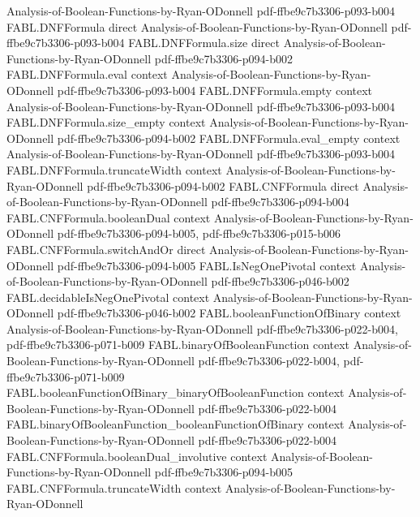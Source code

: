 \begin{theorem}
  {Analysis-of-Boolean-Functions-by-Ryan-ODonnell}
  {pdf-ffbe9c7b3306-p093-b004}
\proofstep
  {FABL.DNFFormula}
  {direct}
  {Analysis-of-Boolean-Functions-by-Ryan-ODonnell}
  {pdf-ffbe9c7b3306-p093-b004}
\proofstep
  {FABL.DNFFormula.size}
  {direct}
  {Analysis-of-Boolean-Functions-by-Ryan-ODonnell}
  {pdf-ffbe9c7b3306-p094-b002}
\proofstep
  {FABL.DNFFormula.eval}
  {context}
  {Analysis-of-Boolean-Functions-by-Ryan-ODonnell}
  {pdf-ffbe9c7b3306-p093-b004}
\proofstep
  {FABL.DNFFormula.empty}
  {context}
  {Analysis-of-Boolean-Functions-by-Ryan-ODonnell}
  {pdf-ffbe9c7b3306-p093-b004}
\proofstep
  {FABL.DNFFormula.size_empty}
  {context}
  {Analysis-of-Boolean-Functions-by-Ryan-ODonnell}
  {pdf-ffbe9c7b3306-p094-b002}
\proofstep
  {FABL.DNFFormula.eval_empty}
  {context}
  {Analysis-of-Boolean-Functions-by-Ryan-ODonnell}
  {pdf-ffbe9c7b3306-p093-b004}
\proofstep
  {FABL.DNFFormula.truncateWidth}
  {context}
  {Analysis-of-Boolean-Functions-by-Ryan-ODonnell}
  {pdf-ffbe9c7b3306-p094-b002}
\proofstep
  {FABL.CNFFormula}
  {direct}
  {Analysis-of-Boolean-Functions-by-Ryan-ODonnell}
  {pdf-ffbe9c7b3306-p094-b004}
\proofstep
  {FABL.CNFFormula.booleanDual}
  {context}
  {Analysis-of-Boolean-Functions-by-Ryan-ODonnell}
  {pdf-ffbe9c7b3306-p094-b005,
    pdf-ffbe9c7b3306-p015-b006}
\proofstep
  {FABL.CNFFormula.switchAndOr}
  {direct}
  {Analysis-of-Boolean-Functions-by-Ryan-ODonnell}
  {pdf-ffbe9c7b3306-p094-b005}
\proofstep
  {FABL.IsNegOnePivotal}
  {context}
  {Analysis-of-Boolean-Functions-by-Ryan-ODonnell}
  {pdf-ffbe9c7b3306-p046-b002}
\proofstep
  {FABL.decidableIsNegOnePivotal}
  {context}
  {Analysis-of-Boolean-Functions-by-Ryan-ODonnell}
  {pdf-ffbe9c7b3306-p046-b002}
\proofstep
  {FABL.booleanFunctionOfBinary}
  {context}
  {Analysis-of-Boolean-Functions-by-Ryan-ODonnell}
  {pdf-ffbe9c7b3306-p022-b004,
    pdf-ffbe9c7b3306-p071-b009}
\proofstep
  {FABL.binaryOfBooleanFunction}
  {context}
  {Analysis-of-Boolean-Functions-by-Ryan-ODonnell}
  {pdf-ffbe9c7b3306-p022-b004,
    pdf-ffbe9c7b3306-p071-b009}
\proofstep
  {FABL.booleanFunctionOfBinary_binaryOfBooleanFunction}
  {context}
  {Analysis-of-Boolean-Functions-by-Ryan-ODonnell}
  {pdf-ffbe9c7b3306-p022-b004}
\proofstep
  {FABL.binaryOfBooleanFunction_booleanFunctionOfBinary}
  {context}
  {Analysis-of-Boolean-Functions-by-Ryan-ODonnell}
  {pdf-ffbe9c7b3306-p022-b004}
\proofstep
  {FABL.CNFFormula.booleanDual_involutive}
  {context}
  {Analysis-of-Boolean-Functions-by-Ryan-ODonnell}
  {pdf-ffbe9c7b3306-p094-b005}
\proofstep
  {FABL.CNFFormula.truncateWidth}
  {context}
  {Analysis-of-Boolean-Functions-by-Ryan-ODonnell}

\end{theorem}
